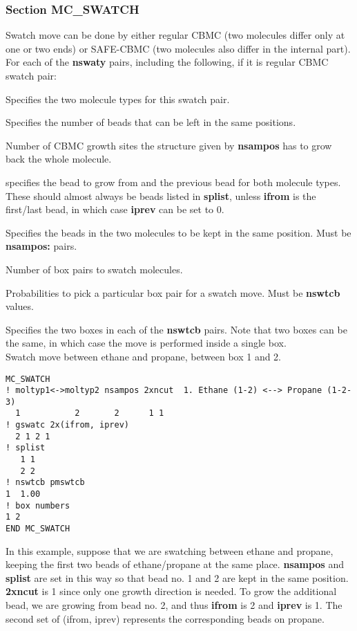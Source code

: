 \documentclass[12pt,letterpaper]{article}
\begin{document}
\subsubsection{Section \textbf{MC\_SWATCH}}
Swatch move can be done by either regular CBMC (two molecules differ only at one or two ends) or SAFE-CBMC (two molecules also differ in the internal part). For each of the \textbf{nswaty} pairs, including the following, if it is regular CBMC swatch pair:

 Specifies the two molecule types for this swatch pair.

 Specifies the number of beads that
can be left in the same positions.

 Number of CBMC growth sites the
structure given by {\bf nsampos} has to grow back the whole
molecule.

 specifies the bead
to grow from and the previous bead for both molecule types.
These should almost always be beads listed in {\bf splist},
unless {\bf ifrom} is the first/last bead, in which case
{\bf iprev} can be set to 0.

 Specifies the beads in the two
molecules to be kept in the same position. Must be {\bf
  nsampos:} pairs.

 Number of box pairs to swatch molecules.

 Probabilities to pick a particular
box pair for a swatch move. Must be {\bf nswtcb} values.

 Specifies the two boxes in each
of the {\bf nswtcb} pairs. Note that two boxes can be the
same, in which case the move is performed inside a single
box. \\

\hfill\break
Swatch move between ethane and propane, between box 1 and 2.

\begin{verbatim}
MC_SWATCH
! moltyp1<->moltyp2 nsampos 2xncut  1. Ethane (1-2) <--> Propane (1-2-3)
  1           2       2      1 1
! gswatc 2x(ifrom, iprev)
  2 1 2 1
! splist
   1 1
   2 2
! nswtcb pmswtcb
1  1.00
! box numbers
1 2
END MC_SWATCH
\end{verbatim}

\noindent In this example, suppose that we are swatching between ethane and propane, keeping the first two beads of ethane/propane at the same place. {\bf nsampos} and {\bf splist} are set in this way so that bead no. 1 and 2 are kept in the same position. {\bf 2xncut} is 1 since only one growth direction is needed. To grow the additional bead, we are growing from bead no. 2, and thus {\bf ifrom} is 2 and {\bf iprev} is 1. The second set of (ifrom, iprev) represents the corresponding beads on propane. \\
\end{document}
